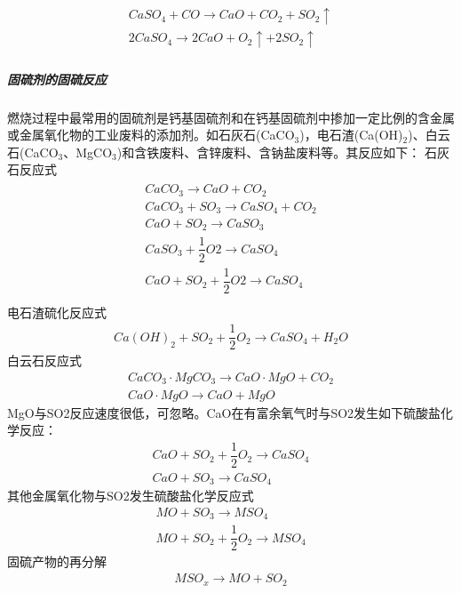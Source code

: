 \documentclass[10pt,openany]{ctexbook}
\begin{document}
\begin{eqnarray}
\begin{split}
  CaSO_4+CO→CaO+CO_2+SO_2↑\\
 2CaSO_4→2CaO+O_2↑+2SO_2↑
  \end{split}
 \end{eqnarray}
 \subparagraph{固硫剂的固硫反应}
燃烧过程中最常用的固硫剂是钙基固硫剂和在钙基固硫剂中掺加一定比例的含金属或金属氧化物的工业废料的添加剂。如石灰石(CaCO$_3$)，电石渣(Ca(OH)$_2$)、白云石(CaCO$_3$、MgCO$_3$)和含铁废料、含锌废料、含钠盐废料等。其反应如下：
石灰石反应式
\begin{eqnarray}
\begin{split}
  CaCO_3→CaO+CO_2 \\
  CaCO_3+SO_3→CaSO_4+CO_2 \\
  CaO+SO_2→CaSO_3 \\
  CaSO_3+\dfrac{1}{2} O2→CaSO_4 \\
  CaO+SO_2+\dfrac{1}{2} O2→CaSO_4 \\
   \end{split}
\end{eqnarray}
电石渣硫化反应式
\begin{eqnarray}
 Ca(OH)_2+SO_2+\dfrac{1}{2} O_2→CaSO_4+H_2O
\end{eqnarray}
白云石反应式
\begin{equation}
\begin{split}
CaCO_3·MgCO_3→CaO·MgO+CO_2\\
  CaO·MgO→CaO+MgO
\end{split}
\end{equation}
MgO与SO2反应速度很低，可忽略。CaO在有富余氧气时与SO2发生如下硫酸盐化学反应：
\begin{equation}
\begin{split}
  CaO+SO_2+\dfrac{1}{2} O_2→CaSO_4   \\    CaO+SO_3→CaSO_4
\end{split}
\end{equation}
其他金属氧化物与SO2发生硫酸盐化学反应式
\begin{equation}
\begin{split}
  MO+SO_3→MSO_4     \\     MO+SO_2+\dfrac{1}{2} O_2→MSO_4
\end{split}
\end{equation}
固硫产物的再分解
\begin{equation}
\begin{split}
  MSO_x→MO+SO_2
\end{split}
\end{equation}
\end{document}
